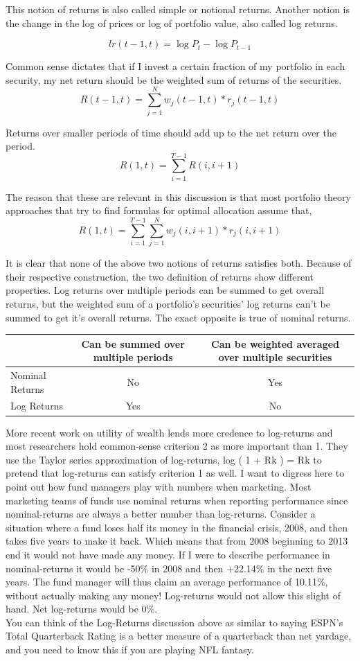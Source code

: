 \documentclass[a4paper]{article}
\begin{document}
This notion of returns is also called simple or notional returns. Another notion is the change in the log of prices or log of portfolio value, also called log returns. 

\[lr(t-1,t) = \log{P_t} - \log{ P_{t-1} } \]

Common sense dictates that if I invest a certain fraction of my portfolio in each security, my net return should be the weighted sum of returns of the securities.
\[ R(t-1,t ) = \sum_{j=1}^N w_j(t-1,t)*r_j(t-1,t) \]

Returns over smaller periods of time should add up to the net return over the period.
\[ R(1,t ) = \sum_{i=1}^{T-1} R(i,i+1)  \]


The reason that these are relevant in this discussion is that most portfolio theory approaches that try to find formulas for optimal allocation assume that,
\[ R(1,t ) = \sum_{i=1}^{T-1} \sum_{j=1}^N w_j(i,i+1)*r_j(i,i+1)  \]


It is clear that none of the above two notions of returns satisfies both. Because of their respective construction, the two definition of returns show different properties. Log returns over multiple periods can be summed to get overall returns, but the weighted sum of a portfolio’s securities’ log returns can’t be summed to get it’s overall returns. The exact opposite is true of nominal returns.


\begin{table}[ h! ]
\centering
\begin{tabular}{l || c || c}
\rowcolor{header}
\hline
&
Can be summed over multiple periods&
Can be weighted averaged over multiple securities\\
\hline
Nominal Returns&
No&
Yes\\
Log Returns&
Yes&
No\\
\end{tabular}
\end{table}

More recent work on utility of wealth lends more credence to log-returns and most researchers hold common-sense criterion 2 as more important than 1. They use the Taylor series approximation of log-returns, log ( 1 + Rk ) = Rk to pretend that log-returns can satisfy criterion 1 as well.
I want to digress here to point out how fund managers play with numbers when marketing. Most marketing teams of funds use nominal returns when reporting performance since nominal-returns are always a better number than log-returns. Consider a situation where a fund loses half its money in the financial crisis, 2008, and then takes five years to make it back. Which means that from 2008 beginning to 2013 end it would not have made any money. If I were to describe performance in nominal-returns it would be -50\% in 2008 and then +22.14\% in the next five years. The fund manager will thus claim an average performance of 10.11\%, without actually making any money! Log-returns would not allow this slight of hand. Net log-returns would be 0\%.\\
You can think of the Log-Returns discussion above as similar to saying ESPN’s Total Quarterback Rating is a better measure of a quarterback than net yardage, and you need to know this if you are playing NFL fantasy.
\end{document}
